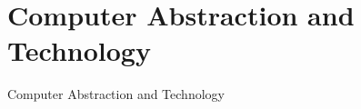 \section{Computer Abstraction and Technology}
\begin{frame}{Computer Abstraction and Technology}
\end{frame}
